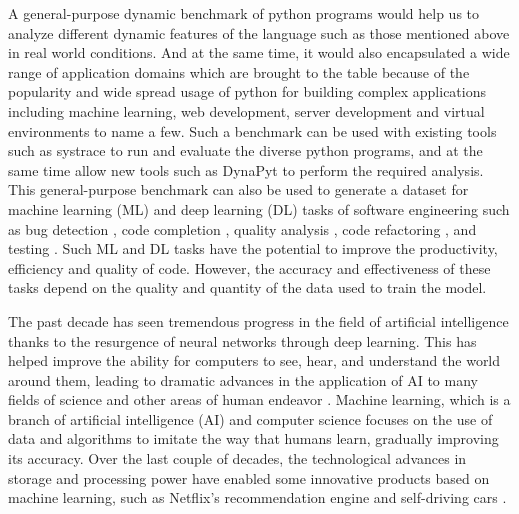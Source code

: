 A general-purpose dynamic benchmark of python programs would help us to analyze different dynamic features of the language such as those mentioned above in real world conditions. And at the same time, it would also encapsulated a wide range of application domains which are brought to the table because of the popularity and wide spread usage of python for building complex applications including machine learning, web development, server development and virtual environments to name a few.  Such a benchmark can be used with existing tools such as systrace \cite{systrace} to run and evaluate the diverse python programs, and at the same time allow new tools such as DynaPyt \cite{DynaPyt2022} to perform the required analysis. This general-purpose benchmark can also be used to generate a dataset for machine learning (ML) and deep learning (DL) tasks of software engineering such as bug detection \cite{DeepBugs2018}, code completion \cite{code_completion}, quality analysis \cite{Code_analysis_1, Code_analysis_2}, code refactoring \cite{code_refactoring}, and testing \cite{testing_1, testing_2, testing_3}. Such ML and DL tasks have the potential to improve the productivity, efficiency and quality of code. However, the accuracy and effectiveness of these tasks depend on the quality and quantity of the data used to train the model.

The past decade has seen tremendous progress in the field of artificial intelligence thanks to the resurgence of neural networks through deep learning. This has helped improve the ability for computers to see, hear, and understand the world around them, leading to dramatic advances in the application of AI to many fields of science and other areas of human endeavor \cite{Machine_Learning_decade}. Machine learning, which is a branch of artificial intelligence (AI) and computer science focuses on the use of data and algorithms to imitate the way that humans learn, gradually improving its accuracy. Over the last couple of decades, the technological advances in storage and processing power have enabled some innovative products based on machine learning, such as Netflix’s recommendation engine and self-driving cars \cite{Machine_Learning}.

